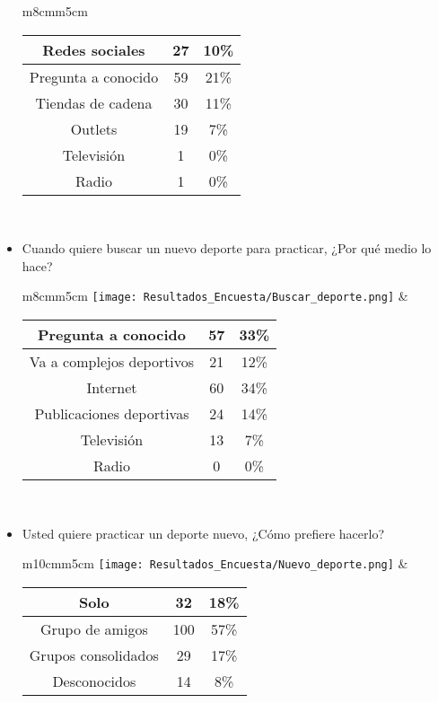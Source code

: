 \begin{itemize}
\begin{tabular}{m{8cm}m{5cm}}
\begin{tabular}{|c|cc|}
         Redes sociales & 27 & 10\% \\ \hline
         Pregunta a conocido & 59 & 21\% \\ \hline
         Tiendas de cadena & 30 & 11\% \\ \hline
         Outlets & 19 & 7\% \\ \hline
         Televisión & 1 & 0\% \\ \hline
         Radio & 1 & 0\% \\ \hline
        \end{tabular} \\
      \end{tabular}
      \newpage
  \item Cuando quiere buscar un nuevo deporte para practicar, ¿Por qué medio lo hace? \\
      \begin{tabular}{m{8cm}m{5cm}}
        \texttt{[image: Resultados\_Encuesta/Buscar\_deporte.png]} &
        \begin{tabular}{|c|cc|}
        \hline
         Pregunta a conocido & 57 & 33\% \\ \hline
         Va a complejos deportivos & 21 & 12\% \\ \hline
         Internet & 60 & 34\% \\ \hline
         Publicaciones deportivas & 24 & 14\% \\ \hline
         Televisión & 13 & 7\% \\ \hline
         Radio & 0 & 0\% \\ \hline
        \end{tabular} \\
      \end{tabular}
  \item Usted quiere practicar un deporte nuevo, ¿Cómo prefiere hacerlo? \\
      \begin{tabular}{m{10cm}m{5cm}}
        \texttt{[image: Resultados\_Encuesta/Nuevo\_deporte.png]} &
        \begin{tabular}{|c|cc|}
        \hline
         Solo & 32 & 18\% \\ \hline
         Grupo de amigos & 100 & 57\% \\ \hline
         Grupos consolidados & 29 & 17\% \\ \hline
         Desconocidos & 14 & 8\% \\ \hline
        \end{tabular} \\

\end{tabular}
\end{itemize}
